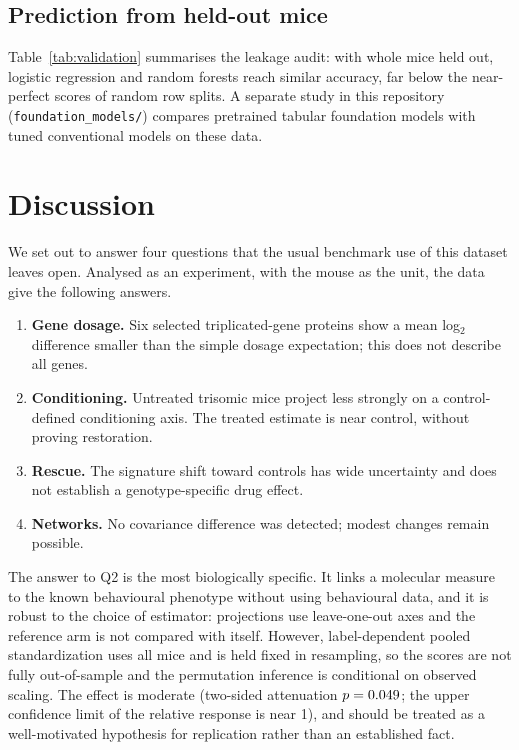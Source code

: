 \documentclass[10pt]{article}
\begin{document}
\subsection{Prediction from held-out mice}
Table~\ref{tab:validation} summarises the leakage audit: with whole mice held out, logistic
regression and random forests reach similar accuracy, far below the near-perfect scores of
random row splits. A separate study in this repository (\texttt{foundation\_models/}) compares
pretrained tabular foundation models with tuned conventional models on these data.

\begin{table}[t]
\centering
\caption{\textbf{Eight-group balanced accuracy under three validation designs.} Mean and SD
over five repeats of five-fold cross-validation.}
\label{tab:validation}
\small

\end{table}

\section{Discussion}

We set out to answer four questions that the usual benchmark use of this dataset leaves open.
Analysed as an experiment, with the mouse as the unit, the data give the following answers.
\begin{enumerate}[label=\textbf{Q\arabic*.}, leftmargin=2.6em]
\item \textbf{Gene dosage.} Six selected triplicated-gene proteins show a mean log$_2$
  difference smaller than the simple dosage expectation; this does not describe all genes.
\item \textbf{Conditioning.} Untreated trisomic mice project less strongly on a control-defined
  conditioning axis. The treated estimate is near control, without proving restoration.
\item \textbf{Rescue.} The signature shift toward controls has wide uncertainty and does not
  establish a genotype-specific drug effect.
\item \textbf{Networks.} No covariance difference was detected; modest changes remain possible.
\end{enumerate}

The answer to Q2 is the most biologically specific. It links a molecular measure to the
known behavioural phenotype without using behavioural data, and it is robust to the choice of
estimator: projections use leave-one-out axes and the reference arm is not compared with itself.
However, label-dependent pooled standardization uses all mice and is held fixed in resampling,
so the scores are not fully out-of-sample and the permutation inference is conditional on
observed scaling. The effect is moderate
(two-sided attenuation $p = 0.049$; the upper confidence limit of the relative response
is near 1), and should be treated as a well-motivated hypothesis for replication rather than an
established fact.
\end{document}
